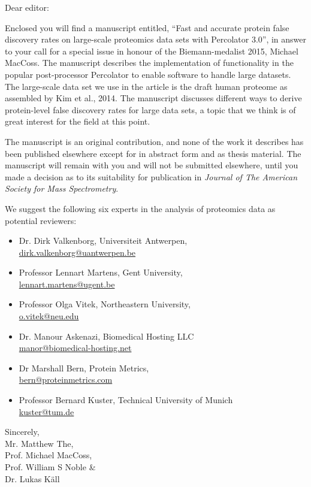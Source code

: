 \documentclass[a4paper]{letter}
\begin{document}
\begin{letter}{}
\vspace*{-5.0cm}

\opening{Dear editor:}

Enclosed you will find a manuscript entitled, ``Fast and accurate
protein false discovery rates on large-scale proteomics data sets with
Percolator 3.0'', in answer to your call for a special issue in
honour of the Biemann-medalist 2015, Michael MacCoss. The manuscript
describes the implementation of functionality in the popular
post-processor Percolator to enable software to handle large
datasets. The large-scale data set we use in the article is the draft
human proteome as assembled by Kim et al., 2014. The manuscript
discusses different ways to derive protein-level false discovery rates
for large data sets, a topic that we think is of great interest for
the field at this point.

The manuscript is an original contribution, and none of the work it
describes has been published elsewhere except for in abstract form and
as thesis material. The manuscript will remain with you and will not
be submitted elsewhere, until you made a decision as to its
suitability for publication in {\em Journal of The American Society
  for Mass Spectrometry}.

We suggest the following six experts in the analysis of proteomics
data as potential reviewers:

\begin{itemize}

\item Dr. Dirk Valkenborg, Universiteit Antwerpen,\\
\url{dirk.valkenborg@uantwerpen.be}

\item Professor Lennart Martens,
Gent University, \\
\url{lennart.martens@ugent.be}

\item Professor Olga Vitek,
      Northeastern University, \\
\url{o.vitek@neu.edu}

\item Dr. Manour Askenazi, Biomedical Hosting LLC\\
\url{manor@biomedical-hosting.net}

\item Dr Marshall Bern, Protein Metrics, \\
\url{bern@proteinmetrics.com}

\item Professor Bernard Kuster, Technical University of Munich\\
\url{kuster@tum.de}

\end{itemize}

\vspace*{1.5em}

Sincerely,\\[2em]
Mr. Matthew The,\\
Prof. Michael MacCoss,\\
Prof. William S Noble \& \\
Dr. Lukas K\"all

\end{letter}
\end{document}
